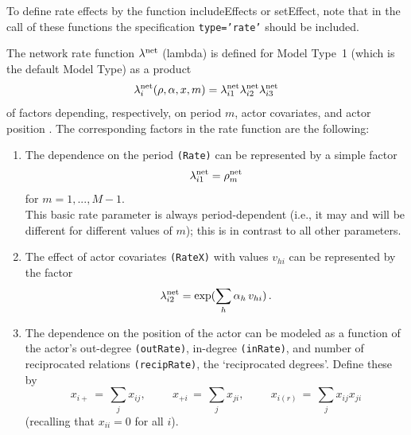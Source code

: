 \documentclass[a4paper,fleqn,11pt]{article}
\newcommand{\+}{\, + \,}
\newcommand{\sfn}[1]{\textsf{#1}}
\begin{document}
To define rate effects by the function \sfn{includeEffects} or \sfn{setEffect},
note that in the call of these functions the specification
\texttt{type='rate'} should be included.
\medskip

The network rate function $\lambda^{\rm net}$
(lambda) is defined for Model Type~1 (which is the default Model
Type) as a product \[ \lambda^{\rm net}_i(\rho, \alpha, x, m) =
\lambda^{\rm net}_{i1} \lambda^{\rm net}_{i2} \lambda^{\rm net}_{i3}
\] of factors depending, respectively, on period $m$, actor
covariates, and actor position \citep[see][p.\ 383]{Snijders01}. The
corresponding factors in the rate function are the following:
\begin{enumerate}
 \item The dependence on the period \texttt{(Rate)}
 can be represented by a simple factor
 \[ \lambda^{\rm net}_{i1} = \rho^{\rm net}_m \]
 for $m = 1, ..., M-1$.\\
 This basic rate parameter is always period-dependent (i.e.,
 it may and will be different for
 different values of $m$); this is in contrast to all other parameters.

 \item The effect of actor covariates \texttt{(RateX)} with values
 $v_{hi}$ can be represented by the factor
 \[ \lambda^{\rm net}_{i2} = \exp(\sum_h \alpha_h \, v_{hi})\,. \]

 \item The dependence on the position of the actor can be modeled
 as a function of the actor's out-degree \texttt{(outRate)},
 in-degree \texttt{(inRate)}, and number
 of reciprocated relations \texttt{(recipRate)}, the `reciprocated degrees'.
 Define these by
 \[ x_{i+} \,=\, \sum_j x_{ij}, \phantom{abcde} x_{+i} \,=\, \sum_j x_{ji},
                \phantom{abcde} x_{i(r)} \,=\, \sum_j x_{ij}x_{ji} \]
 (recalling that $x_{ii} = 0$ for all $i$).\\

\end{enumerate}
\end{document}
